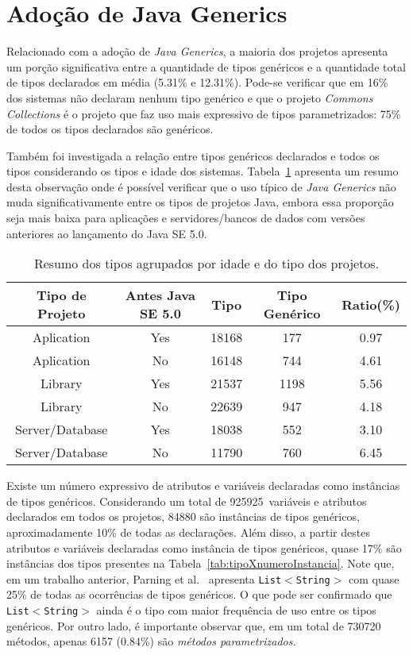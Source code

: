 
\section{Adoção de Java Generics}
Relacionado com a adoção de \textit{Java Generics}, a maioria dos projetos apresenta um porção significativa entre a quantidade de tipos genéricos e a quantidade total de tipos declarados em média (5.31\% e 12.31\%). Pode-se verificar que em 16\% dos sistemas não declaram nenhum tipo genérico e que o projeto \textit{Commons Collections} é o projeto que faz uso 
mais expressivo de tipos parametrizados: 
75\% de todos os tipos declarados são genéricos.

Também foi investigada a relação entre tipos genéricos declarados e todos os tipos considerando os tipos e idade dos sistemas. Tabela~\ref{tab:std} apresenta um resumo desta observação onde é possível verificar que o uso típico de  \textit{Java Generics} não muda significativamente entre os tipos de projetos Java, embora essa proporção seja mais baixa para aplicações e servidores/bancos de dados com versões anteriores ao lançamento do Java SE 5.0.

\begin{table}[h!]
	\centering
	\caption{Resumo dos tipos agrupados por idade e do tipo dos projetos.}
	\begin{tabular}{ccccc} \hline 
		Tipo de Projeto & Antes Java SE 5.0 & Tipo & Tipo Genérico & Ratio(\%) \\ \hline\hline
		Aplication & Yes & 18168 & 177 & 0.97 \\
		Aplication & No & 16148 & 744 & 4.61 \\
		Library & Yes & 21537 & 1198 & 5.56 \\
		Library & No & 22639 & 947 & 4.18 \\
		Server/Database & Yes & 18038 & 552 & 3.10 \\ 
		Server/Database & No & 11790 & 760 & 6.45 \\ \hline
	\end{tabular}
	\label{tab:std} %
\end{table}


Existe um número expressivo de atributos e variáveis declaradas como instâncias de tipos genéricos. Considerando um total de \num{925925}\ variáveis e atributos declarados em todos os projetos, \num{84880} são instâncias de tipos genéricos, aproximadamente 10\% de todas as declarações. Além disso, a partir destes atributos e variáveis declaradas como instância de tipos genéricos, quase 17\% são instâncias dos tipos presentes na Tabela~\ref{tab:tipoXnumeroInstancia}. Note que, em um trabalho anterior, Parning et al.~\cite{Parnin:ACM2011} apresenta \texttt{List$<$String$>$} com quase 25\% de todas as ocorr\^{e}ncias 
de tipos genéricos. O que pode ser confirmado que \texttt{List$<$String$>$} ainda é o tipo com maior frequência de uso entre os tipos genéricos. 
Por outro lado, \'{e} importante observar que, em um total de 
\num{730720} métodos, apenas \num{6157} (0.84\%) 
são \emph{métodos parametrizados.}

